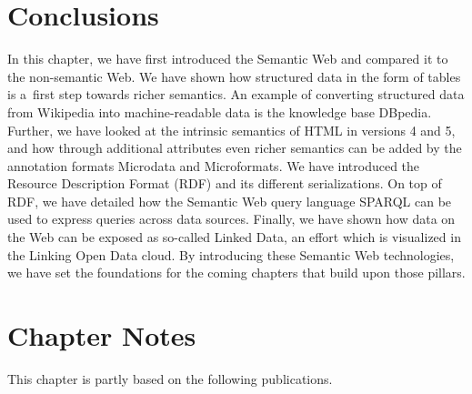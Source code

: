 \section{Conclusions}

In this chapter, we have first introduced the Semantic Web
and compared it to the non-semantic Web.
We have shown how structured data in the form of tables
is a~first step towards richer semantics.
An example of converting structured data from Wikipedia
into machine-readable data is the knowledge base DBpedia.
Further, we have looked at the intrinsic semantics
of HTML in versions 4 and 5,
and how through additional attributes
even richer semantics can be added
by the annotation formats Microdata and Microformats.
We have introduced the Resource Description Format (RDF)
and its different serializations.
On top of RDF, we have detailed
how the Semantic Web query language SPARQL
can be used to express queries across data sources.
Finally, we have shown how data on the Web
can be exposed as so-called Linked Data,
an effort which is visualized in the Linking Open Data cloud.
By introducing these Semantic Web technologies,
we have set the foundations for the coming chapters
that build upon those pillars.

\section*{Chapter Notes}
This chapter is partly based on the following publications.

\begin{itemize}
  steiner2010howgoogleisusing}.
  \item \bibentry{steiner2011enrichingunstructured}.
\end{itemize}


\clearpage

